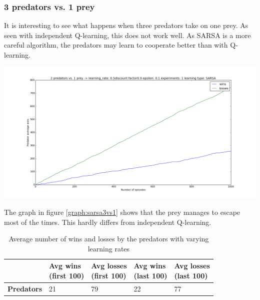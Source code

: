 \subsubsection{3 predators vs. 1 prey}
It is interesting to see what happens when three predators take on one prey. As seen with independent Q-learning, this does not work well. As SARSA is a more careful algorithm, the predators may learn to cooperate better than with Q-learning.

\begin{center}
	\includegraphics[scale=0.3]{3_predators_SARSA}
	\label{graph:sarsa3vs1}
\end{center}

The graph in figure \ref{graph:sarsa3vs1} shows that the prey manages to escape most of the times. This hardly differs from independent Q-learning.

\begin{table}[H]
\begin{center}
\begin{tabular}{| l | l | l | l | l |}
\hline
 & \parbox{2cm}{\textbf{Avg wins \\ (first 100)}} & \parbox{2cm}{\textbf{Avg losses \\ (first 100)}} & \parbox{2cm}{\textbf{Avg wins \\ (last 100)}} & \parbox{2cm}{\textbf{Avg losses \\ (last 100)}} \\
\hline
\textbf{Predators} & 21 & 79 & 22 & 77 \\
\hline
\end{tabular}
\caption{Average number of wins and losses by the predators with varying learning rates}
\end{center}
\end{table}

